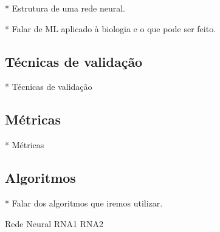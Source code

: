 * Estrutura de uma rede neural.

* Falar de ML aplicado à biologia e o que pode ser feito.

\subsection{Técnicas de validação}
* Técnicas de validação

\subsection{Métricas}
* Métricas

\subsection{Algoritmos}
* Falar dos algoritmos que iremos utilizar.

Rede Neural RNA1
RNA2